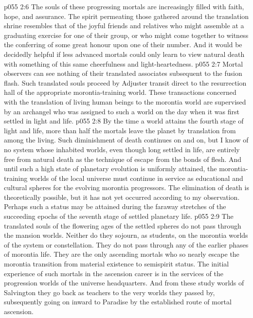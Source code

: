 \vs p055 2:6 The souls of these progressing mortals are increasingly filled with faith, hope, and assurance. The spirit permeating those gathered around the translation shrine resembles that of the joyful friends and relatives who might assemble at a graduating exercise for one of their group, or who might come together to witness the conferring of some great honour upon one of their number. And it would be decidedly helpful if less advanced mortals could only learn to view natural death with something of this same cheerfulness and light\hyp{}heartedness.
\vs p055 2:7 \pc Mortal observers can see nothing of their translated associates subsequent to the fusion flash. Such translated souls proceed by Adjuster transit direct to the resurrection hall of the appropriate morontia\hyp{}training world. These transactions concerned with the translation of living human beings to the morontia world are supervised by an archangel who was assigned to such a world on the day when it was first settled in light and life.
\vs p055 2:8 By the time a world attains the fourth stage of light and life, more than half the mortals leave the planet by translation from among the living. Such diminishment of death continues on and on, but I know of no system whose inhabited worlds, even though long settled in life, are entirely free from natural death as the technique of escape from the bonds of flesh. And until such a high state of planetary evolution is uniformly attained, the morontia\hyp{}training worlds of the local universe must continue in service as educational and cultural spheres for the evolving morontia progressors. The elimination of death is theoretically possible, but it has not yet occurred according to my observation. Perhaps such a status may be attained during the faraway stretches of the succeeding epochs of the seventh stage of settled planetary life.
\vs p055 2:9 \pc The translated souls of the flowering ages of the settled spheres do not pass through the mansion worlds. Neither do they sojourn, as students, on the morontia worlds of the system or constellation. They do not pass through any of the earlier phases of morontia life. They are the only ascending mortals who so nearly escape the morontia transition from material existence to semispirit status. The initial experience of such  mortals in the ascension career is in the services of the progression worlds of the universe headquarters. And from these study worlds of Salvington they go back as teachers to the very worlds they passed by, subsequently going on inward to Paradise by the established route of mortal ascension.
